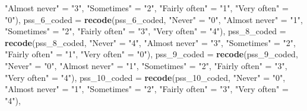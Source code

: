 \documentclass[]{article}
\newenvironment{Shaded}{\begin{snugshade}}{\end{snugshade}}
\newcommand{\DataTypeTok}[1]{\textcolor[rgb]{0.13,0.29,0.53}{#1}}
\newcommand{\DecValTok}[1]{\textcolor[rgb]{0.00,0.00,0.81}{#1}}
\newcommand{\KeywordTok}[1]{\textcolor[rgb]{0.13,0.29,0.53}{\textbf{#1}}}
\newcommand{\NormalTok}[1]{#1}
\newcommand{\StringTok}[1]{\textcolor[rgb]{0.31,0.60,0.02}{#1}}
\begin{document}
\begin{Shaded}
\begin{Highlighting}[]
{{                        \StringTok{"Almost never"}\NormalTok{ =}\StringTok{ "3"}\NormalTok{,}
                        \StringTok{"Sometimes"}\NormalTok{ =}\StringTok{ "2"}\NormalTok{, }
                        \StringTok{"Fairly often"}\NormalTok{ =}\StringTok{ "1"}\NormalTok{,}
                        \StringTok{"Very often"}\NormalTok{ =}\StringTok{ "0"}\NormalTok{), }
         \DataTypeTok{pss_6_coded =} \KeywordTok{recode}\NormalTok{(pss_}\DecValTok{6}\NormalTok{_coded, }
                        \StringTok{"Never"}\NormalTok{ =}\StringTok{ "0"}\NormalTok{,}
                        \StringTok{"Almost never"}\NormalTok{ =}\StringTok{ "1"}\NormalTok{,}
                        \StringTok{"Sometimes"}\NormalTok{ =}\StringTok{ "2"}\NormalTok{, }
                        \StringTok{"Fairly often"}\NormalTok{ =}\StringTok{ "3"}\NormalTok{,}
                        \StringTok{"Very often"}\NormalTok{ =}\StringTok{ "4"}\NormalTok{),}
         \DataTypeTok{pss_8_coded =} \KeywordTok{recode}\NormalTok{(pss_}\DecValTok{8}\NormalTok{_coded, }
                        \StringTok{"Never"}\NormalTok{ =}\StringTok{ "4"}\NormalTok{,}
                        \StringTok{"Almost never"}\NormalTok{ =}\StringTok{ "3"}\NormalTok{,}
                        \StringTok{"Sometimes"}\NormalTok{ =}\StringTok{ "2"}\NormalTok{, }
                        \StringTok{"Fairly often"}\NormalTok{ =}\StringTok{ "1"}\NormalTok{,}
                        \StringTok{"Very often"}\NormalTok{ =}\StringTok{ "0"}\NormalTok{),}
         \DataTypeTok{pss_9_coded =} \KeywordTok{recode}\NormalTok{(pss_}\DecValTok{9}\NormalTok{_coded, }
                        \StringTok{"Never"}\NormalTok{ =}\StringTok{ "0"}\NormalTok{,}
                        \StringTok{"Almost never"}\NormalTok{ =}\StringTok{ "1"}\NormalTok{,}
                        \StringTok{"Sometimes"}\NormalTok{ =}\StringTok{ "2"}\NormalTok{, }
                        \StringTok{"Fairly often"}\NormalTok{ =}\StringTok{ "3"}\NormalTok{,}
                        \StringTok{"Very often"}\NormalTok{ =}\StringTok{ "4"}\NormalTok{),}
         \DataTypeTok{pss_10_coded =} \KeywordTok{recode}\NormalTok{(pss_}\DecValTok{10}\NormalTok{_coded, }
                        \StringTok{"Never"}\NormalTok{ =}\StringTok{ "0"}\NormalTok{,}
                        \StringTok{"Almost never"}\NormalTok{ =}\StringTok{ "1"}\NormalTok{,}
                        \StringTok{"Sometimes"}\NormalTok{ =}\StringTok{ "2"}\NormalTok{, }
                        \StringTok{"Fairly often"}\NormalTok{ =}\StringTok{ "3"}\NormalTok{,}
                        \StringTok{"Very often"}\NormalTok{ =}\StringTok{ "4"}\NormalTok{),}
}}
\end{Highlighting}
\end{Shaded}
\end{document}
